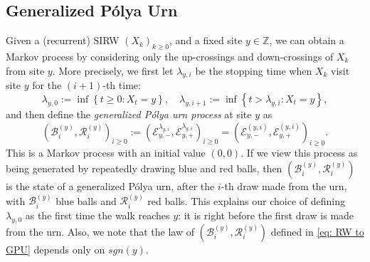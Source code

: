 \documentclass[EJP]{ejpecp} %
\begin{document}
\subsection{Generalized P\'{o}lya Urn}
Given a (recurrent) SIRW $(X_k)_{k\geq 0}$, and a fixed site $y\in \mathbb{Z}$, we can obtain a Markov process by considering only the up-crossings and down-crossings of $X_k$ from site $y$. More precisely, we first let $\lambda_{y,i}$ be the stopping time when $X_k$ visit site $y$ for the $\left( i+1 \right) $-th time:
\[
\lambda_{y,0} :=\inf\left\{ t\geq 0: X_t = y \right\} , \quad \lambda_{y,i+1} := \inf\left\{ t> \lambda_{y, i}: X_t = y \right\},
\] 
and then define the \textit{generalized P\'olya urn process} at site $y$ as 
\begin{equation} \label{eq: RW to GPU}
	\left(\mathscr{B}^{(y)}_{i},\mathscr{R}^{(y)}_{i} \right)_{i\ge 0}
	:=\left(\mathcal{E}^{\lambda_{y,i}}_{y,-}, \mathcal{E}^{\lambda_{y,i}}_{y,+}\right)_{i\geq 0} 
	=  \left(\mathcal{E}^{(y,i)}_{y,-}, \mathcal{E}^{(y,i)}_{y,+}\right)_{i\geq 0}.
\end{equation}
This is a Markov process with an initial value $(0,0)$. 
If we view this process as being generated by repeatedly drawing blue and red balls, then
$\left(\mathscr{B}_{i}^{(y)},\mathscr{R}_{i}^{(y)} \right)$ is the state of a generalized P\'olya urn, after the $i$-th draw made from the urn, with $\mathscr{B}_{i}^{(y)}$ blue balls and $\mathscr{R}_{i}^{(y)}$ red balls. 
This explains our choice of defining $\lambda_{y, 0}$ as the first time the walk reaches $y$: it is right before the first draw is made from the urn. Also, we note that the law of  $\left(\mathscr{B}_{i}^{(y)},\mathscr{R}_{i}^{(y)} \right)$ defined in \eqref{eq: RW to GPU} depends only on
$sgn(y)$.
\end{document}
